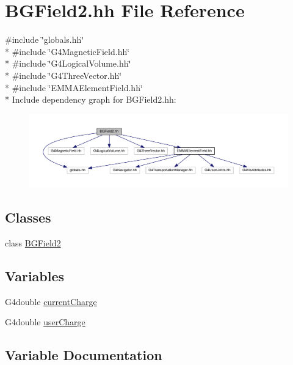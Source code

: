 \hypertarget{BGField2_8hh}{}\section{B\+G\+Field2.\+hh File Reference}
\label{BGField2_8hh}
{\ttfamily \#include \char`\"{}globals.\+hh\char`\"{}}\\*
{\ttfamily \#include \char`\"{}G4\+Magnetic\+Field.\+hh\char`\"{}}\\*
{\ttfamily \#include \char`\"{}G4\+Logical\+Volume.\+hh\char`\"{}}\\*
{\ttfamily \#include \char`\"{}G4\+Three\+Vector.\+hh\char`\"{}}\\*
{\ttfamily \#include \char`\"{}E\+M\+M\+A\+Element\+Field.\+hh\char`\"{}}\\*
Include dependency graph for B\+G\+Field2.\+hh\+:
\nopagebreak
\begin{figure}[H]
\begin{center}
\leavevmode
\includegraphics[width=350pt]{BGField2_8hh__incl}
\end{center}
\end{figure}
\subsection*{Classes}
\begin{DoxyCompactItemize}
\item 
class \hyperlink{classBGField2}{B\+G\+Field2}
\end{DoxyCompactItemize}
\subsection*{Variables}
\begin{DoxyCompactItemize}
\item 
G4double \hyperlink{BGField2_8hh_acb265d8eecfa1acd31056f0c7915362e}{current\+Charge}
\item 
G4double \hyperlink{BGField2_8hh_a2d61cdd1b1b5ed409f7c91b54737c1b9}{user\+Charge}
\end{DoxyCompactItemize}


\subsection{Variable Documentation}
